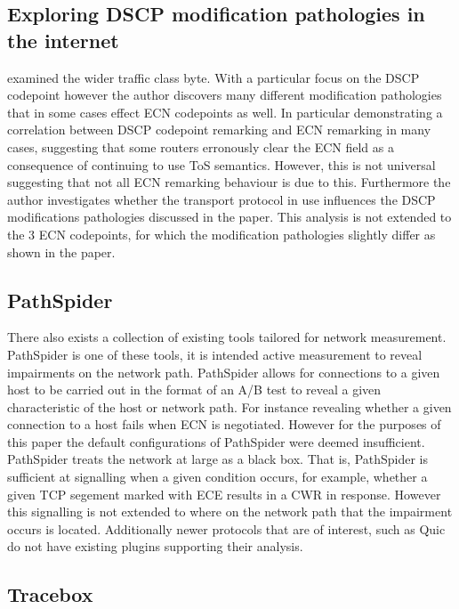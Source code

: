 \documentclass{l4proj}
\begin{document}
\subsection{Exploring DSCP modification pathologies in the internet}

\cite{custura_exploring_2017} examined the wider traffic class byte. With a particular focus on the DSCP codepoint however the author discovers many different modification pathologies that in some cases effect ECN codepoints as well. In particular demonstrating a correlation between DSCP codepoint remarking and ECN remarking in many cases, suggesting that some routers erronously clear the ECN field as a consequence of continuing to use ToS semantics. However, this is not universal suggesting that not all ECN remarking behaviour is due to this. Furthermore the author investigates whether the transport protocol in use influences the DSCP modifications pathologies discussed in the paper. This analysis is not extended to the 3 ECN codepoints, for which the modification pathologies slightly differ as shown in the paper.

\subsection{PathSpider}

There also exists a collection of existing tools tailored for network measurement. PathSpider is one of these tools, it is intended active measurement to reveal impairments on the network path. PathSpider allows for connections to a given host to be carried out in the format of an A/B test to reveal a given characteristic of the host or network path. For instance revealing whether a given connection to a host fails when ECN is negotiated. However for the purposes of this paper the default configurations of PathSpider were deemed insufficient. PathSpider treats the network at large as a black box. That is, PathSpider is sufficient at signalling when a given condition occurs, for example, whether a given TCP segement marked with ECE results in a CWR in response. However this signalling is not extended to where on the network path that the impairment occurs is located. Additionally newer protocols that are of interest, such as Quic do not have existing plugins supporting their analysis.

\subsection{Tracebox}
\end{document}
